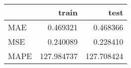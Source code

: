 \begin{tabular}{lrr}
\toprule
{} &       train &        test \\
\midrule
MAE  &    0.469321 &    0.468366 \\
MSE  &    0.240089 &    0.228410 \\
MAPE &  127.984737 &  127.708424 \\
\bottomrule
\end{tabular}

